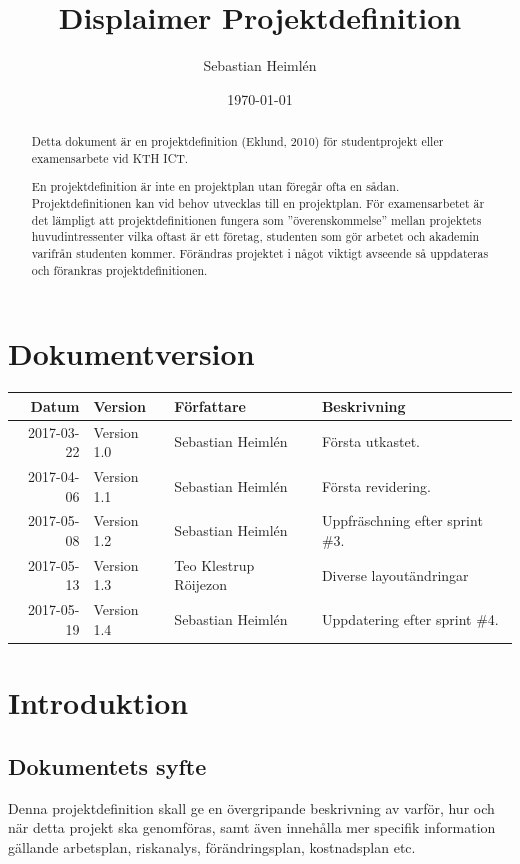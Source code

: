 \documentclass[11pt]{article}
\author{Sebastian Heimlén}
\date{\today}
\title{Displaimer Projektdefinition}
\begin{document}
\maketitle
\begin{abstract}
Detta dokument är en projektdefinition (Eklund, 2010) för studentprojekt eller examensarbete vid KTH ICT.

En projektdefinition är inte en projektplan utan föregår ofta en sådan. Projektdefinitionen kan
vid behov utvecklas till en projektplan. För examensarbetet är det lämpligt att projektdefinitionen
fungera som ”överenskommelse” mellan projektets huvudintressenter vilka oftast är ett företag, studenten
som gör arbetet och akademin varifrån studenten kommer. Förändras projektet i något viktigt avseende
så uppdateras och förankras projektdefinitionen.
\end{abstract}


\section*{Dokumentversion}
\label{sec:orgc9297a6}
\begin{center}
\begin{tabular}{rlll}
\textbf{Datum} & \textbf{Version} & \textbf{Författare} & \textbf{Beskrivning}\\
\hline
2017-03-22 & Version 1.0 & Sebastian Heimlén & Första utkastet.\\
2017-04-06 & Version 1.1 & Sebastian Heimlén & Första revidering.\\
2017-05-08 & Version 1.2 & Sebastian Heimlén & Uppfräschning efter sprint \#3.\\
2017-05-13 & Version 1.3 & Teo Klestrup Röijezon & Diverse layoutändringar\\
2017-05-19 & Version 1.4 & Sebastian Heimlén & Uppdatering efter sprint \#4.\\
\end{tabular}
\end{center}


\pagebreak
\setcounter{tocdepth}{4}
\tableofcontents

\section{Introduktion}
\label{sec:org8fb627a}
\subsection{Dokumentets syfte}
\label{sec:org2176475}
Denna projektdefinition skall ge en övergripande beskrivning av varför,
hur och när detta projekt ska genomföras, samt även innehålla mer
specifik information gällande arbetsplan, riskanalys, förändringsplan,
kostnadsplan etc.
\end{document}
